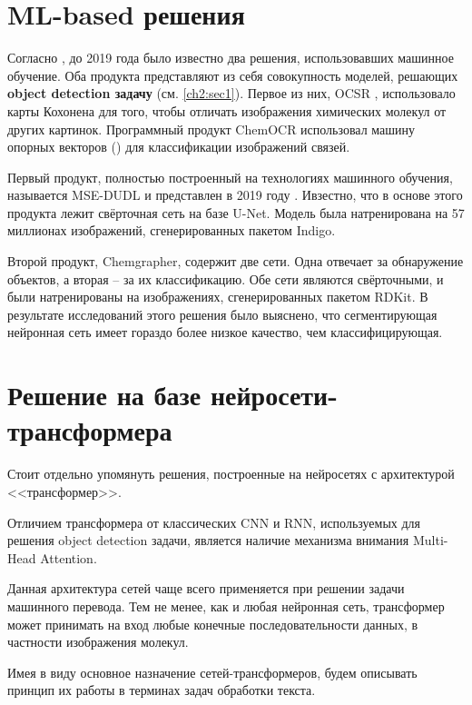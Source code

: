 \section{ML-based решения} \label{ch1:sec3}

Согласно \cite{rajan2020review}, до 2019 года было известно два решения, использовавших машинное обучение. Оба продукта представляют из себя совокупность моделей, решающих \textbf{object detection задачу} (см. \ref{ch2:sec1}). Первое из них, OCSR \cite{gkoutos2003chemical}, использовало карты Кохонена для того, чтобы отличать изображения химических молекул от других картинок. Программный продукт ChemOCR использовал машину опорных векторов (\cite{cortes1995support}) для классификации изображений связей.

Первый продукт, полностью построенный на технологиях машинного обучения, называется MSE-DUDL и представлен в 2019 году \cite{staker2019molecular}. Ивзестно, что в основе этого продукта лежит свёрточная сеть на базе U-Net. Модель была натренирована на 57 миллионах изображений, сгенерированных пакетом Indigo.

Второй продукт, Chemgrapher, содержит две сети. Одна отвечает за обнаружение объектов, а вторая -- за их классификацию. Обе сети являются свёрточными, и были натренированы на изображениях, сгенерированных пакетом RDKit. В результате исследований этого решения было выяснено, что сегментирующая нейронная сеть имеет гораздо более низкое качество, чем классифицирующая.

\section{Решение на базе нейросети-трансформера} \label{ch1:sec4}

Стоит отдельно упомянуть решения, построенные на нейросетях с архитектурой <<трансформер>>.

Отличием трансформера от классических CNN и RNN, используемых для решения object detection задачи, является наличие механизма внимания Multi-Head Attention.

Данная архитектура сетей чаще всего применяется при решении задачи машинного перевода. Тем не менее, как и любая нейронная сеть, трансформер может принимать на вход любые конечные последовательности данных, в частности изображения молекул.

Имея в виду основное назначение сетей-трансформеров, будем описывать принцип их работы в терминах задач обработки текста.

